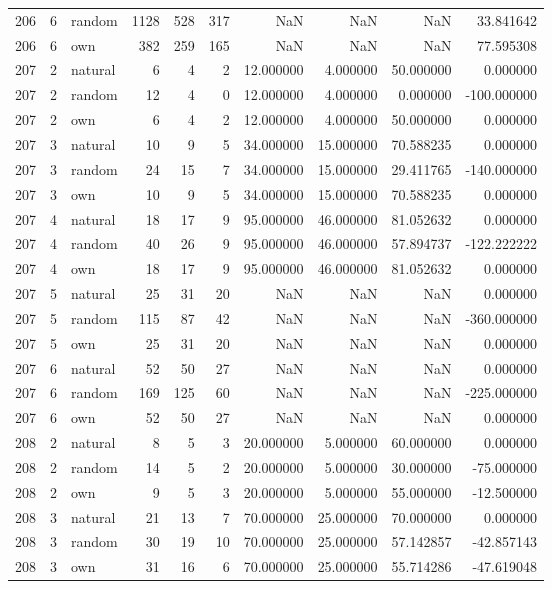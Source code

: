 \begin{table}[htbp]
\begin{tabular}{rrlrrrrrrr}
206 & 6 & random & 1128 & 528 & 317 & NaN & NaN & NaN & 33.841642 \\
206 & 6 & own & 382 & 259 & 165 & NaN & NaN & NaN & 77.595308 \\
207 & 2 & natural & 6 & 4 & 2 & 12.000000 & 4.000000 & 50.000000 & 0.000000 \\
207 & 2 & random & 12 & 4 & 0 & 12.000000 & 4.000000 & 0.000000 & -100.000000 \\
207 & 2 & own & 6 & 4 & 2 & 12.000000 & 4.000000 & 50.000000 & 0.000000 \\
207 & 3 & natural & 10 & 9 & 5 & 34.000000 & 15.000000 & 70.588235 & 0.000000 \\
207 & 3 & random & 24 & 15 & 7 & 34.000000 & 15.000000 & 29.411765 & -140.000000 \\
207 & 3 & own & 10 & 9 & 5 & 34.000000 & 15.000000 & 70.588235 & 0.000000 \\
207 & 4 & natural & 18 & 17 & 9 & 95.000000 & 46.000000 & 81.052632 & 0.000000 \\
207 & 4 & random & 40 & 26 & 9 & 95.000000 & 46.000000 & 57.894737 & -122.222222 \\
207 & 4 & own & 18 & 17 & 9 & 95.000000 & 46.000000 & 81.052632 & 0.000000 \\
207 & 5 & natural & 25 & 31 & 20 & NaN & NaN & NaN & 0.000000 \\
207 & 5 & random & 115 & 87 & 42 & NaN & NaN & NaN & -360.000000 \\
207 & 5 & own & 25 & 31 & 20 & NaN & NaN & NaN & 0.000000 \\
207 & 6 & natural & 52 & 50 & 27 & NaN & NaN & NaN & 0.000000 \\
207 & 6 & random & 169 & 125 & 60 & NaN & NaN & NaN & -225.000000 \\
207 & 6 & own & 52 & 50 & 27 & NaN & NaN & NaN & 0.000000 \\
208 & 2 & natural & 8 & 5 & 3 & 20.000000 & 5.000000 & 60.000000 & 0.000000 \\
208 & 2 & random & 14 & 5 & 2 & 20.000000 & 5.000000 & 30.000000 & -75.000000 \\
208 & 2 & own & 9 & 5 & 3 & 20.000000 & 5.000000 & 55.000000 & -12.500000 \\
208 & 3 & natural & 21 & 13 & 7 & 70.000000 & 25.000000 & 70.000000 & 0.000000 \\
208 & 3 & random & 30 & 19 & 10 & 70.000000 & 25.000000 & 57.142857 & -42.857143 \\
208 & 3 & own & 31 & 16 & 6 & 70.000000 & 25.000000 & 55.714286 & -47.619048 \\

\end{tabular}
\end{table}
